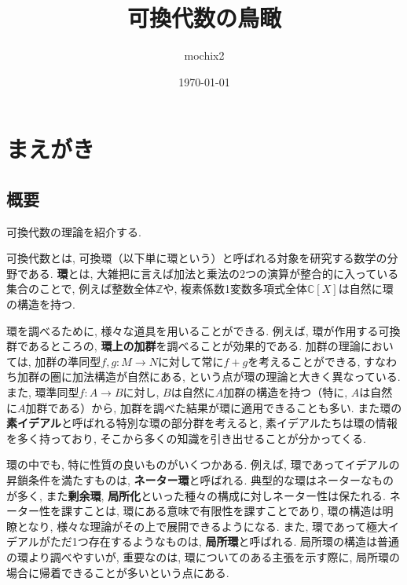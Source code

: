 \documentclass[a4paper, twoside]{bxjsarticle}
\title{可換代数の鳥瞰}
\author{mochix2}
\date{\today}
\newcommand{\zah}{\mathbb{Z}}
\newcommand{\com}{\mathbb{C}}
\newcommand{\tb}{\textbf}
\theoremstyle{definition}
\begin{document}
    \maketitle
    
    \pagestyle{fancy}
    \lhead[\leftmark]{\thepage}
    \rhead[\thepage]{\rightmark}
    \cfoot{\thepage}

    \cleardoublepage
    \section*{まえがき}
        \subsection*{概要}
        可換代数の理論を紹介する. 
        
        可換代数とは, 可換環（以下単に環という）と呼ばれる対象を研究する数学の分野である.
        \tb{環}とは, 大雑把に言えば加法と乗法の2つの演算が整合的に入っている集合のことで, 例えば整数全体$\zah$や, 複素係数1変数多項式全体$\com [X]$は自然に環の構造を持つ.
        
        環を調べるために, 様々な道具を用いることができる.
        例えば, 環が作用する可換群であるところの, \tb{環上の加群}を調べることが効果的である.
        加群の理論においては, 加群の準同型$f, g\colon M\to N$に対して常に$f+g$を考えることができる, すなわち加群の圏に加法構造が自然にある, という点が環の理論と大きく異なっている.
        また, 環準同型$f\colon A\to B$に対し, $B$は自然に$A$加群の構造を持つ（特に, $A$は自然に$A$加群である）から, 加群を調べた結果が環に適用できることも多い.
        また環の\tb{素イデアル}と呼ばれる特別な環の部分群を考えると, 素イデアルたちは環の情報を多く持っており, そこから多くの知識を引き出せることが分かってくる. 
        
        環の中でも, 特に性質の良いものがいくつかある. 例えば, 環であってイデアルの昇鎖条件を満たすものは, \tb{ネーター環}と呼ばれる.
        典型的な環はネーターなものが多く, また\tb{剰余環}, \tb{局所化}といった種々の構成に対しネーター性は保たれる.
        ネーター性を課すことは, 環にある意味で有限性を課すことであり, 環の構造は明瞭となり, 様々な理論がその上で展開できるようになる.
        また, 環であって極大イデアルがただ1つ存在するようなものは, \tb{局所環}と呼ばれる. 局所環の構造は普通の環より調べやすいが, 重要なのは, 環についてのある主張を示す際に, 局所環の場合に帰着できることが多いという点にある.

\end{document}

